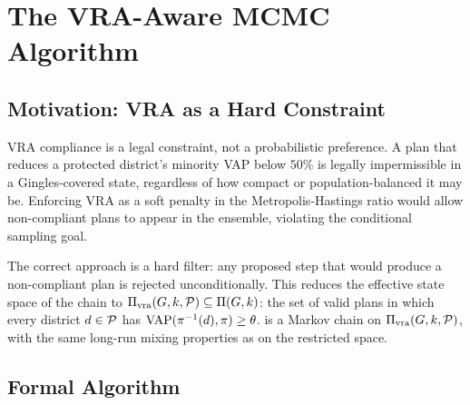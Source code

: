 \section{The VRA-Aware MCMC Algorithm}
\label{sec:algorithm}

\subsection{Motivation: VRA as a Hard Constraint}

VRA compliance is a legal constraint, not a probabilistic preference.
A plan that reduces a protected district's minority VAP below $50\%$ is legally
impermissible in a Gingles-covered state, regardless of how compact or
population-balanced it may be.
Enforcing VRA as a soft penalty in the Metropolis-Hastings ratio would allow
non-compliant plans to appear in the ensemble, violating the conditional
sampling goal.

The correct approach is a hard filter: any proposed step that would produce a
non-compliant plan is rejected unconditionally.
This reduces the effective state space of the chain to
$\Pi_{\mathrm{vra}}(G, k, \mathcal{P}) \subseteq \Pi(G, k)$: the set of valid
plans in which every district $d \in \mathcal{P}$ has
$\mathrm{VAP}(\pi^{-1}(d), \pi) \geq \theta$.
\vr{} is a Markov chain on $\Pi_{\mathrm{vra}}(G, k, \mathcal{P})$, with the
same long-run mixing properties as \fr{} on the restricted space.

\subsection{Formal Algorithm}

